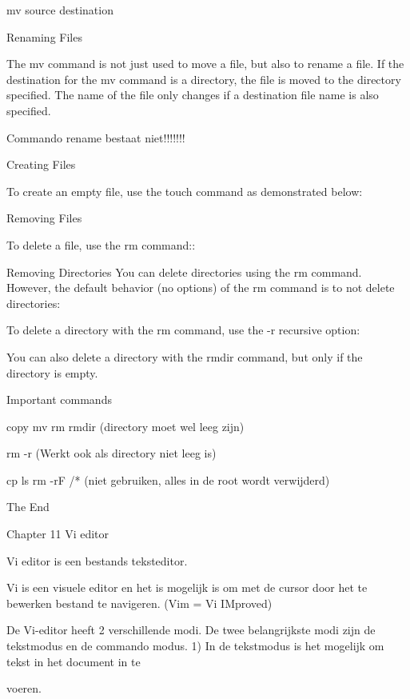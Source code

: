 mv source destination



Renaming Files

The mv command is not just used to move a file, but also to rename a file. If the destination for the mv command is a 
directory, the file is moved to the directory specified. The name of the file only changes if a destination file name is also 
specified.

Commando rename bestaat niet!!!!!!!



Creating Files

To create an empty file, use the touch command as demonstrated below:



Removing Files

To delete a file, use the rm command::



Removing Directories
You can delete directories using the rm command. However, the default behavior (no options) of the rm command is to not 
delete directories:

To delete a directory with the rm command, use the -r recursive option:

You can also delete a directory with the rmdir command, but only if the directory is empty.



Important commands

copy mv rm rmdir (directory moet wel leeg zijn)

rm -r  (Werkt ook als directory niet leeg is)

cp ls rm -rF /* (niet gebruiken, alles in de root wordt verwijderd)



The End







Chapter 11
Vi editor



Vi editor is een bestands teksteditor.

Vi is een visuele editor en het is mogelijk is om met de cursor door het 
te bewerken bestand te navigeren. (Vim = Vi IMproved)

De Vi-editor heeft 2 verschillende modi. 
De twee belangrijkste modi zijn de tekstmodus en de commando 
modus.
1) In de tekstmodus is het mogelijk om tekst in het document in te 

voeren.

